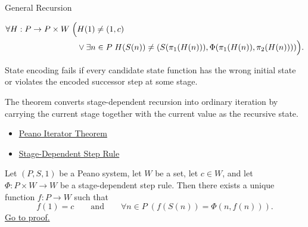 \begin{topicbox}{General Recursion}

\begin{remark*}
\[
\begin{aligned}
\forall H:P\to P\times W\;\Bigl(&
H(1)\neq (1,c)\\
&\lor \exists n\in P\;
H(S(n))\neq(S(\pi_1(H(n))),\Phi(\pi_1(H(n)),\pi_2(H(n))))\Bigr).
\end{aligned}
\]
\end{remark*}

\begin{remark*}
State encoding fails if every candidate state function has the wrong initial
state or violates the encoded successor step at some stage.
\end{remark*}

\begin{remark*}[Interpretation]
The theorem converts stage-dependent recursion into ordinary iteration by
carrying the current stage together with the current value as the recursive
state.
\end{remark*}

\begin{remark*}[Dependencies]
\begin{itemize}
  \item \hyperref[thm:peano-iterator-theorem]{Peano Iterator Theorem}
  \item \hyperref[def:stage-dependent-step-rule]{Stage-Dependent Step Rule}
\end{itemize}
\end{remark*}

\begin{tcolorbox}[colback=thmbox, colframe=thmborder, arc=2pt,
  left=6pt, right=6pt, top=4pt, bottom=4pt,
  title={\small\textbf{Theorem (General Recursion Theorem)}},
  fonttitle=\small\bfseries]
\begin{theorem}
\label{thm:general-recursion-theorem-for-peano-system}
Let $(P,S,1)$ be a Peano system, let $W$ be a set, let $c\in W$, and let
$\Phi:P\times W\to W$ be a stage-dependent step rule. Then there exists a
unique function $f:P\to W$ such that
\[
f(1)=c
\qquad\text{and}\qquad
\forall n\in P\;(f(S(n))=\Phi(n,f(n))).
\]
\hyperref[prf:general-recursion-theorem-for-peano-system]{Go to proof.}
\end{theorem}
\end{tcolorbox}


\end{topicbox}
